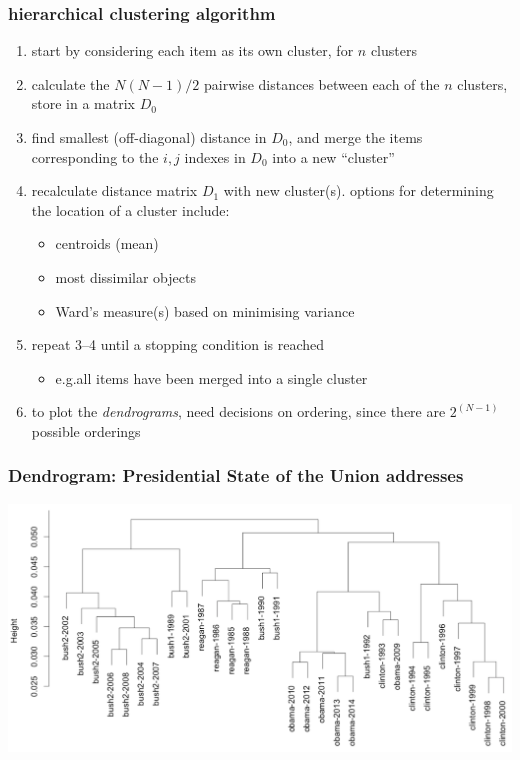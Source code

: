 \documentclass{beamer}
\begin{document}
\begin{frame}
	\frametitle{hierarchical clustering algorithm}
	\begin{enumerate}
		\item start by considering each item as its own cluster, for $n$ clusters
		\item \pause calculate the $N(N-1)/2$ pairwise distances between each of
		the $n$ clusters, store in a matrix $D_0$
		\item \pause find smallest (off-diagonal) distance in $D_0$, and merge the
		items corresponding to the $i, j$ indexes in $D_0$ into a new ``cluster''
		\item \pause recalculate distance matrix $D_1$ with new cluster(s).
		\pause options for determining the location of a cluster include:
		\begin{itemize}
			\item centroids (mean)
			\item most dissimilar objects
			\item Ward's measure(s) based on minimising variance
		\end{itemize}
		\item \pause repeat 3--4 until a stopping condition is reached
		\begin{itemize}
			\item e.g.\@ all items have been merged into a single cluster
		\end{itemize}
		\item \pause to plot the \emph{dendrograms}, need decisions on ordering, since
		there are $2^{(N-1)}$ possible orderings
	\end{enumerate}
\end{frame}


\begin{frame}
	\frametitle{Dendrogram: Presidential State of the Union addresses}
	\hspace*{-1cm}
	\includegraphics[width=1.15\textwidth]{figures/speechDendrogram.pdf}
\end{frame}
\end{document}

